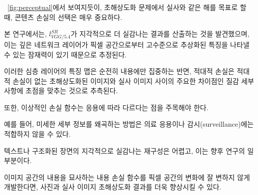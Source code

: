 \documentclass[10pt,twocolumn,letterpaper]{article}
\newcommand{\kor}[1]{#1}
\newcommand{\eng}[1]{}
\begin{document}
\eng{
Of particular importance when aiming for photo-realistic solutions to the \ac{SR} problem is the choice of the content loss as illustrated in \figurename~\ref{fig:perceptual}.
}\kor{
\figurename~\ref{fig:perceptual}에서 보여지듯이, \ac{초해상도화} 문제에서 실사와 같은 해를 목표로 할 때, 콘텐츠 손실의 선택은 매우 중요하다.
} \eng{
In this work, we found $l^{SR}_{VGG/5.4}$ to yield the perceptually most convincing results, which we attribute to the potential of deeper network layers to represent features of higher abstraction \cite{zeiler2014visualizing,Yosinski2015,Mahendran2016} away from pixel space.
}\kor{
본 연구에서는, $l^{SR}_{VGG/5.4}$가 지각적으로 더 실감나는 결과를 산출하는 것을 발견했으며,
이는 깊은 네트워크 레이어가 픽셀 공간으로부터 고수준으로 추상화된 특징\cite{zeiler2014visualizing,Yosinski2015,Mahendran2016}을 나타낼 수 있는 잠재력이 있기 때문으로 추정된다.
} \eng{
We speculate that feature maps of these deeper layers focus purely on the content while leaving the adversarial loss focusing on texture details which are the main difference between the super-resolved images without the adversarial loss and photo-realistic images.
}\kor{
이러한 심층 레이어의 특징 맵은 순전히 내용에만 집중하는 반면, 적대적 손실은 적대적 손실이 없는 초해상도화된 이미지와 실사 이미지 사이의 주요한 차이점인 질감 세부 사항에 초점을 맞추는 것으로 추측된다.
}
\eng{
We also note that the ideal loss function depends on the application.
}\kor{
또한, 이상적인 손실 함수는 응용에 따라 다르다는 점을 주목해야 한다.
} \eng{
For example, approaches that hallucinate finer detail might be less suited for medical applications or surveillance.
}\kor{
예를 들어, 미세한 세부 정보를 왜곡하는 방법은 의료 응용이나 감시(surveillance)에는 적합하지 않을 수 있다.
} \eng{
The perceptually convincing reconstruction of text or structured scenes \cite{Huang15selfexemplars} is challenging and part of future work.
}\kor{
텍스트나 구조화된 장면의 지각적으로 실감나는 재구성\cite{Huang15selfexemplars}은 어렵고, 이는 향후 연구의 일부분이다.
}
\eng{
The development of content loss functions that describe image spatial content, but more invariant to changes in pixel space will further improve photo-realistic image \ac{SR} results.
}\kor{
이미지 공간의 내용을 묘사하는 내용 손실 함수를 픽셀 공간의 변화에 잘 변하지 않게 개발한다면, 사진과 실사 이미지 \ac{초해상도화} 결과를 더욱 향상시킬 수 있다.
}
%
\end{document}
